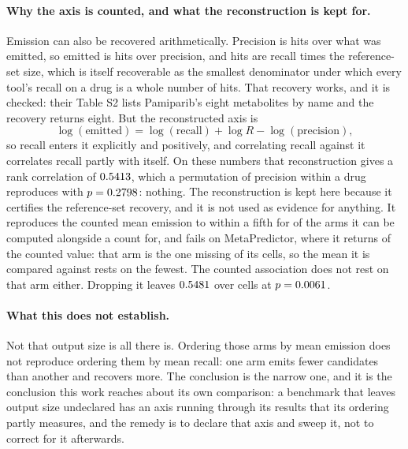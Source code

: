 \documentclass[journal=jcisd8,manuscript=suppinfo,layout=onecolumn]{achemso}
\begin{document}
\paragraph{Why the axis is counted, and what the reconstruction is kept for.} Emission can also be
recovered arithmetically. Precision is hits over what was emitted, so emitted is hits over
precision, and hits are recall times the reference-set size, which is itself recoverable as the
smallest denominator under which every tool's recall on a drug is a whole number of hits. That
recovery works, and it is checked: their Table S2 lists Pamiparib's eight metabolites by name and
the recovery returns eight. But the reconstructed axis is
\[
  \log(\text{emitted}) = \log(\text{recall}) + \log R - \log(\text{precision}),
\]
so recall enters it explicitly and positively, and correlating recall against it correlates recall
partly with itself. On these numbers that reconstruction gives a rank correlation of
$0.5413$, which a permutation of precision within a drug reproduces with
$p = 0.2798$: nothing. The reconstruction is kept here because it certifies
the reference-set recovery, and it is not used as evidence for anything. It reproduces the counted
mean emission to within a fifth for \numExtbudgetAgreeingarmsWord{} of the
\numExtbudgetCountedarmsWord{} arms it can be computed alongside a count for, and fails on
MetaPredictor, where it returns \numExtbudgetWorstratio{} of the counted value: that arm is the one
missing \numExtbudgetWorstarmabsentWord{} of its cells, so the mean it is compared against rests on
the fewest. The counted association does not rest on that arm either. Dropping it leaves
$0.5481$ over \numExtbudgetCellswithoutworst{} cells at
$p = 0.0061$.

\paragraph{What this does not establish.} Not that output size is all there is. Ordering those arms
by mean emission does not reproduce ordering them by mean recall: one arm emits fewer candidates
than another and recovers more. The conclusion is the narrow one, and it is the conclusion this
work reaches about its own comparison: a benchmark that leaves output size undeclared has an axis
running through its results that its ordering partly measures, and the remedy is to declare that
axis and sweep it, not to correct for it afterwards.
\end{document}
